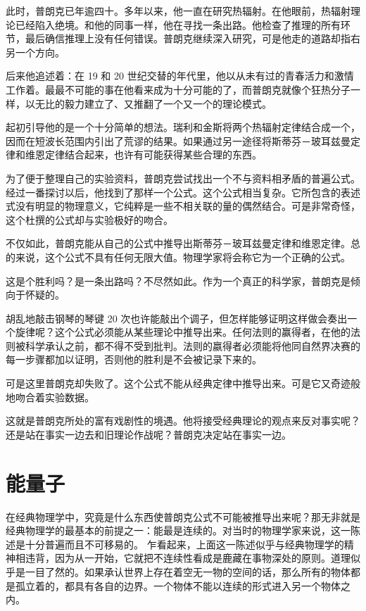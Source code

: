 此时，普朗克已年逾四十。多年以来，他一直在研究热辐射。在他眼前，热辐射理论已经陷入绝境。和他的同事一样，他在寻找一条出路。他检查了推理的所有环节，最后确信推理上没有任何错误。普朗克继续深入研究，可是他走的道路却指右另一个方向。

后来他追述着：在 19 和 20 世纪交替的年代里，他以从未有过的青春活力和激情工作着。最最不可能的事在他看来成为十分可能的了，而普朗克就像个狂热分子一样，以无比的毅力建立了、又推翻了一个又一个的理论模式。

起初引导他的是一个十分简单的想法。瑞利和金斯将两个热辐射定律结合成一个，因而在短波长范围内引出了荒谬的结果。如果通过另一途径将斯蒂芬－玻耳兹曼定律和维恩定律结合起来，也许有可能获得某些合理的东西。

为了便于整理自己的实验资料，普朗克尝试找出一个不与资料相矛盾的普遍公式。经过一番探讨以后，他找到了那样一个公式。这个公式相当复杂。它所包含的表述式没有明显的物理意义，它纯粹是一些不相关联的量的偶然结合。可是非常奇怪，这个杜撰的公式却与实验极好的吻合。

不仅如此，普朗克能从自己的公式中推导出斯蒂芬－玻耳兹曼定律和维恩定律。总的来说，这个公式不具有任何无限大值。物理学家将会称它为一个正确的公式。

这是个胜利吗？是一条出路吗？不尽然如此。作为一个真正的科学家，普朗克是倾向于怀疑的。

胡乱地敲击钢琴的琴键 20 次也许能敲出个调子，但怎样能够证明这样做会奏出一个旋律呢？这个公式必须能从某些理论中推导出来。任何法则的赢得者，在他的法则被科学承认之前，都不得不受到批判。法则的嬴得者必须能将他同自然界决赛的每一步骤都加以证明，否则他的胜利是不会被记录下来的。

可是这里普朗克却失败了。这个公式不能从经典定律中推导出来。可是它又奇迹般地吻合着实验数据。

这就是普朗克所处的富有戏剧性的境遇。他将接受经典理论的观点来反对事实呢？还是站在事实一边去和旧理论作战呢？普朗克决定站在事实一边。

\section{能量子}

在经典物理学中，究竟是什么东西使普朗克公式不可能被推导出来呢？那无非就是经典物理学的最基本的前提之一：能最是连续的。对当时的物理学家来说，这一陈述是十分普遍而且不可移易的。
乍看起来，上面这一陈述似乎与经典物理学的精神相违背，因为从一开始，它就把不连续性看成是鹿藏在事物深处的原则。道理似乎是一目了然的。如果承认世界上存在着空无一物的空间的话，那么所有的物体都是孤立着的，都具有各自的边界。一个物体不能以连续的形式进入另一个物体之内。

